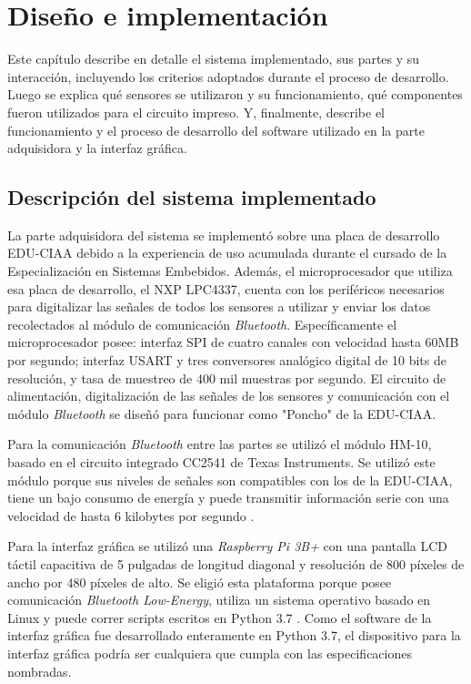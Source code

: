\chapter{Diseño e implementación} %

\label{Chapter3}

Este capítulo describe en detalle el sistema implementado, sus partes y su interacción, incluyendo los criterios adoptados durante el proceso de desarrollo. Luego se explica qué sensores se utilizaron y su funcionamiento, qué componentes fueron utilizados para el circuito impreso. Y, finalmente, describe el funcionamiento y el proceso de desarrollo del software utilizado en la parte adquisidora y la interfaz gráfica.

\section{Descripción del sistema implementado}

La parte adquisidora del sistema se implementó sobre una placa de desarrollo EDU-CIAA debido a la experiencia de uso acumulada durante el cursado de la Especialización en Sistemas Embebidos. Además, el microprocesador que utiliza esa placa de desarrollo, el NXP LPC4337, cuenta con los periféricos necesarios para digitalizar las señales de todos los sensores a utilizar y enviar los datos recolectados al módulo de comunicación \textit{Bluetooth}. Específicamente el microprocesador posee: interfaz SPI de cuatro canales con velocidad hasta 60MB por segundo; interfaz USART y tres conversores analógico digital de 10 bits de resolución, y tasa de muestreo de 400 mil muestras por segundo. El circuito de alimentación, digitalización de las señales de los sensores y comunicación con el módulo \textit{Bluetooth} se diseñó para funcionar como "Poncho"  \cite{poncho} de la EDU-CIAA.

Para la comunicación \textit{Bluetooth} entre las partes se utilizó el módulo HM-10, basado en el circuito integrado CC2541 de Texas Instruments. Se utilizó este módulo porque sus niveles de señales son compatibles con los de la EDU-CIAA, tiene un bajo consumo de energía y puede transmitir información serie con una velocidad de hasta 6 kilobytes por segundo \cite{HM-10}.

Para la interfaz gráfica se utilizó una \textit{Raspberry Pi 3B+} con una pantalla LCD táctil capacitiva de 5 pulgadas de longitud diagonal y resolución de 800 píxeles de ancho por 480 píxeles de alto. Se eligió esta plataforma porque posee comunicación \textit{Bluetooth Low-Energy}, utiliza un sistema operativo basado en Linux y puede correr scripts escritos en Python 3.7 \cite{raspberrypi}. Como el software de la interfaz gráfica fue desarrollado enteramente en Python 3.7, el dispositivo para la interfaz gráfica podría ser cualquiera que cumpla con las especificaciones nombradas.

